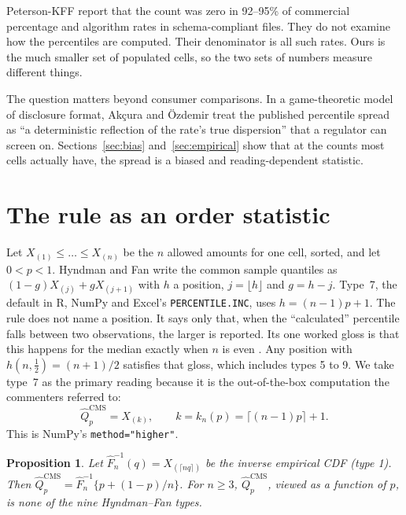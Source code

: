 \documentclass[11pt]{article}
\newtheorem{proposition}{Proposition}
\theoremstyle{remark}
\newcommand{\ceil}[1]{\lceil #1 \rceil}
\newcommand{\floor}[1]{\lfloor #1 \rfloor}
\begin{document}
Peterson-KFF \citep{kff2026} report that the count was zero in 92--95\% of commercial percentage and algorithm rates in schema-compliant files. They do not examine how the percentiles are computed. Their denominator is all such rates. Ours is the much smaller set of populated cells, so the two sets of numbers measure different things.

The question matters beyond consumer comparisons. In a game-theoretic model of disclosure format, Ak\c{c}ura and \"{O}zdemir \citep{akcura2026} treat the published percentile spread as ``a deterministic reflection of the rate's true dispersion'' that a regulator can screen on. Sections~\ref{sec:bias} and~\ref{sec:empirical} show that at the counts most cells actually have, the spread is a biased and reading-dependent statistic.

\section{The rule as an order statistic}\label{sec:rule}

Let $X_{(1)}\le\dots\le X_{(n)}$ be the $n$ allowed amounts for one cell, sorted, and let $0<p<1$. Hyndman and Fan \citep{hyndmanfan1996} write the common sample quantiles as $(1-g)X_{(j)}+gX_{(j+1)}$ with $h$ a position, $j=\floor{h}$ and $g=h-j$. Type~7, the default in R, NumPy and Excel's \texttt{PERCENTILE.INC}, uses $h=(n-1)p+1$. The rule does not name a position. It says only that, when the ``calculated'' percentile falls between two observations, the larger is reported. Its one worked gloss is that this happens for the median exactly when $n$ is even \citep[][at 53993]{fr2025}. Any position with $h(n,\tfrac12)=(n+1)/2$ satisfies that gloss, which includes types 5 to 9. We take type~7 as the primary reading because it is the out-of-the-box computation the commenters referred to:
\begin{equation}\label{eq:cms}
\widehat Q^{\mathrm{CMS}}_p = X_{(k)},\qquad k=k_n(p)=\ceil{(n-1)p}+1 .
\end{equation}
This is NumPy's \texttt{method="higher"}.

\begin{proposition}\label{prop:type1}
Let $\widehat F_n^{-1}(q)=X_{(\ceil{nq})}$ be the inverse empirical CDF (type 1). Then $\widehat Q^{\mathrm{CMS}}_p=\widehat F_n^{-1}\{p+(1-p)/n\}$. For $n\ge 3$, $\widehat Q^{\mathrm{CMS}}_p$, viewed as a function of $p$, is none of the nine Hyndman--Fan types.
\end{proposition}
\end{document}
